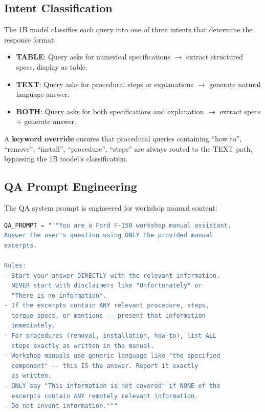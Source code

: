 \documentclass[12pt, a4paper]{article}
\begin{document}
\subsection{Intent Classification}

The 1B model classifies each query into one of three intents that determine the response format:

\begin{itemize}[itemsep=2pt]
  \item \textbf{TABLE}: Query asks for numerical specifications $\rightarrow$ extract structured specs, display as table.
  \item \textbf{TEXT}: Query asks for procedural steps or explanations $\rightarrow$ generate natural language answer.
  \item \textbf{BOTH}: Query asks for both specifications and explanation $\rightarrow$ extract specs + generate answer.
\end{itemize}

A \textbf{keyword override} ensures that procedural queries containing ``how to'', ``remove'', ``install'', ``procedure'', ``steps'' are always routed to the TEXT path, bypassing the 1B model's classification.

\subsection{QA Prompt Engineering}

The QA system prompt is engineered for workshop manual content:

\begin{lstlisting}[language=Python, caption={QA system prompt}]
QA_PROMPT = """You are a Ford F-150 workshop manual assistant.
Answer the user's question using ONLY the provided manual
excerpts.

Rules:
- Start your answer DIRECTLY with the relevant information.
  NEVER start with disclaimers like "Unfortunately" or
  "There is no information".
- If the excerpts contain ANY relevant procedure, steps,
  torque specs, or mentions -- present that information
  immediately.
- For procedures (removal, installation, how-to), list ALL
  steps exactly as written in the manual.
- Workshop manuals use generic language like "the specified
  component" -- this IS the answer. Report it exactly
  as written.
- ONLY say "This information is not covered" if NONE of the
  excerpts contain ANY remotely relevant information.
- Do not invent information."""
\end{lstlisting}
\end{document}
